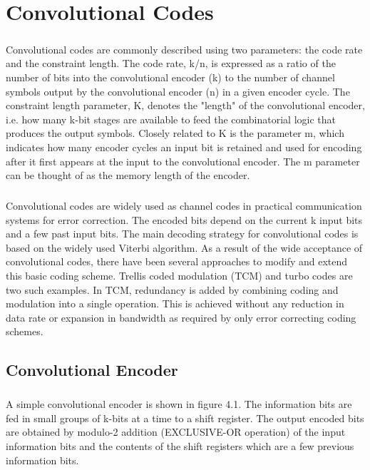 \documentclass[14pt]{report}
\begin{document}
{\chapter{Convolutional Codes}
\thispagestyle{fancy}
\paragraph{} Convolutional codes are commonly described using two parameters: the code rate and the constraint length. The code rate, k/n, is expressed as a ratio of the number of bits into the convolutional encoder (k) to the number of channel symbols output by the convolutional encoder (n) in a given encoder cycle. The constraint length parameter, K, denotes the "length" of the convolutional encoder, i.e. how many k-bit stages are available to feed the combinatorial logic that produces the output symbols. Closely related to K is the parameter m, which indicates how many encoder cycles an input bit is retained and used for encoding after it first appears at the input to the convolutional encoder. The m parameter can be thought of as the memory length of the encoder.
\paragraph{} Convolutional codes are widely used as channel codes in practical communication systems for error correction. The encoded bits depend on the current k input bits and a few past input bits. The main decoding strategy for convolutional codes is based on the widely used Viterbi algorithm. As a result of the wide acceptance of convolutional codes, there have been several approaches to modify and extend this basic coding scheme. Trellis coded modulation (TCM) and turbo codes are two such examples. In TCM, redundancy is added by combining coding and modulation into a single operation. This is achieved without any reduction in data rate or expansion in bandwidth as required by only error correcting coding schemes.
\section{Convolutional Encoder}
\paragraph{} A simple convolutional encoder is shown in figure 4.1. The information bits are fed in small groups of k-bits at a time to a shift register. The output encoded bits are obtained by modulo-2 addition (EXCLUSIVE-OR operation) of the input information bits and the contents of the shift registers which are a few previous information bits.

}
\end{document}
